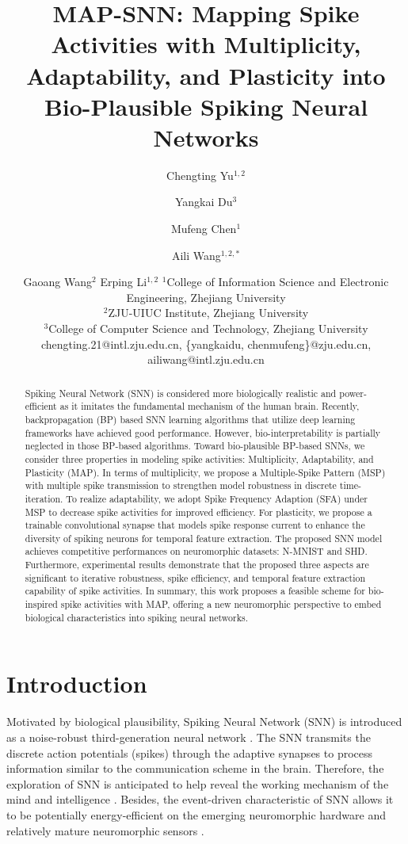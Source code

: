 \documentclass{article}
\title{MAP-SNN: Mapping Spike Activities with Multiplicity, Adaptability, and Plasticity into Bio-Plausible Spiking Neural Networks}
\author{
Chengting Yu$^{1,2}$
\and
Yangkai Du$^3$\and
Mufeng Chen$^1$\and
Aili Wang$^{1,2,*}$\and
Gaoang Wang$^2$\And
Erping Li$^{1,2}$
\affiliations
$^1$College of Information Science and Electronic Engineering, Zhejiang University\\
$^2$ZJU-UIUC Institute, Zhejiang University\\
$^3$College of Computer Science and Technology, Zhejiang University
\emails
chengting.21@intl.zju.edu.cn,
\{yangkaidu, chenmufeng\}@zju.edu.cn,
ailiwang@intl.zju.edu.cn
}
\begin{document}
\maketitle

\begin{abstract}
Spiking Neural Network (SNN) is considered more biologically realistic and power-efficient as it imitates the fundamental mechanism of the human brain.
Recently, backpropagation (BP) based SNN learning algorithms that utilize deep learning frameworks have achieved good performance.
However, bio-interpretability is partially neglected in those BP-based algorithms.
Toward bio-plausible BP-based SNNs, we consider three properties in modeling spike activities: Multiplicity, Adaptability, and Plasticity (MAP).
In terms of multiplicity, we propose a Multiple-Spike Pattern (MSP) with multiple spike transmission to strengthen model robustness in discrete time-iteration. 
To realize adaptability, we adopt Spike Frequency Adaption (SFA) under MSP to decrease spike activities for improved efficiency.
For plasticity, we propose a trainable convolutional synapse that models spike response current to enhance the diversity of spiking neurons for temporal feature extraction.
The proposed SNN model achieves competitive performances on neuromorphic datasets: N-MNIST and SHD. 
Furthermore, experimental results demonstrate that the proposed three aspects are significant to iterative robustness, spike efficiency, and temporal feature extraction capability of spike activities.
In summary, this work proposes a feasible scheme for bio-inspired spike activities with MAP, offering a new neuromorphic perspective to embed biological characteristics into spiking neural networks.




\end{abstract}



\section{Introduction}


Motivated by biological plausibility, Spiking Neural Network (SNN) is introduced as a noise-robust third-generation neural network \cite{maass_networks_1997}. The SNN transmits the discrete action potentials (spikes) through the adaptive synapses to process information similar to the communication scheme in the brain. Therefore, the exploration of SNN is anticipated to help reveal the working mechanism of the mind and intelligence \cite{ghosh-dastidar_spiking_2009}. 
Besides, the event-driven characteristic of SNN allows it to be potentially energy-efficient on the emerging neuromorphic hardware and relatively mature neuromorphic sensors \cite{vanarse_review_2016}.
\end{document}
